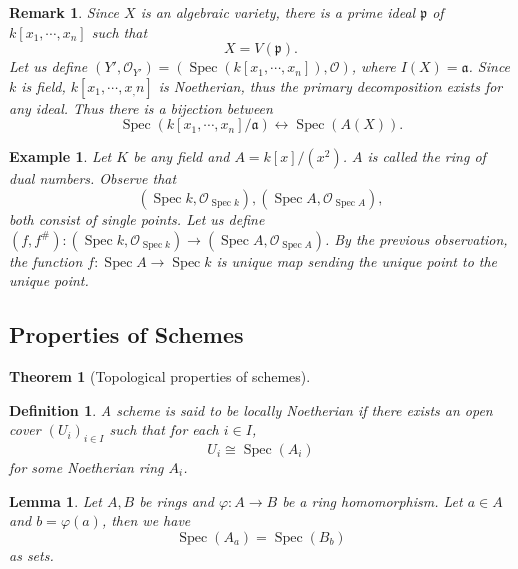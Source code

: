 \documentclass{article}
\newtheorem{theorem}{Theorem}[section]
\newtheorem{definition}{Definition}[section]
\newtheorem{lemma}{Lemma}[section]
\newtheorem{remark}{Remark}[section]
\newtheorem{example}{Example}[section]
\numberwithin{equation}{section}
\DeclareMathOperator{\Spec}{Spec}
\newcommand*{\multivar}[2]{{#1_1,\cdots,#1_{#2}}}
\newcommand*{\ringedspacemorph}[1]{(#1,#1^{\#})}
\newcommand*{\sheaf}[2]{(#1,{\mathcal{#2}}_{#1})}
\begin{document}
\begin{remark}
Since $X$ is an algebraic variety, there is a prime ideal $\mathfrak{p}$ of $k[x_1,\cdots,x_n]$ such that
\begin{equation*}
X=V(\mathfrak{p}).
\end{equation*}
Let us define $\sheaf{Y'}{O}=(\Spec(k[\multivar{x}{n}]),\mathcal{O})$, where $I(X)=\mathfrak{a}$. Since $k$ is field, $k[\multivar{x},{n}]$ is Noetherian, thus the primary decomposition exists for any ideal. Thus there is a bijection between
\begin{equation*}
\Spec(k[\multivar{x}{n}]/\mathfrak{a}) \leftrightarrow \Spec(A(X)).
\end{equation*}
\end{remark}

\begin{example}
Let $K$ be any field and $A=k[x]/(x^2)$. $A$ is called the ring of dual numbers. Observe that
\begin{equation*}
\sheaf{\Spec k}{O},\sheaf{\Spec A}{O},
\end{equation*}
both consist of single points. Let us define $\ringedspacemorph{f}:\sheaf{\Spec k}{O}\to\sheaf{\Spec A}{O}$. By the previous observation, the function $f:\Spec A\to \Spec k$ is unique map sending the unique point to the unique point. 
\end{example}

\subsection{Properties of Schemes}

\begin{theorem}[Topological properties of schemes]
\label{topological_properties_schemes}
\end{theorem}

\begin{definition}
A scheme is said to be locally Noetherian if there exists an open cover $(U_i)_{i\in I}$ such that for each $i\in I$,
\begin{equation}
U_i\cong \Spec(A_i)
\label{quasi_compact_affine_set}
\end{equation}
for some Noetherian ring $A_i$. 
\end{definition}

\begin{lemma}
Let $A,B$ be rings and $\varphi:A\to B$ be a ring homomorphism. Let $a\in A$ and $b=\varphi(a)$, then we have
\begin{equation*}
\Spec(A_a)=\Spec(B_b)
\end{equation*}
as sets.
\label{bijection_localization_spec}
\end{lemma}
\end{document}
